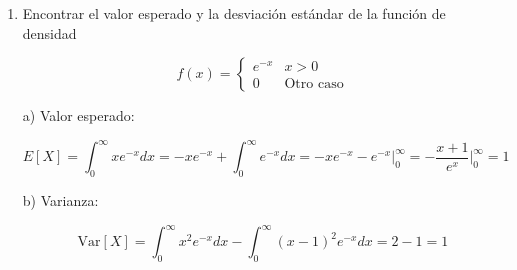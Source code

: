 \documentclass[a4paper, 12pt]{article}
\newcommand{\Aspace}{0.2cm}
\begin{document}
    \begin{enumerate}
        \item Encontrar el valor esperado y la desviación estándar de la función de densidad \par
        \[
            f(x) =
            \begin{cases}
                e^{-x} & x > 0 \\
                0 & \text{Otro caso}
            \end{cases}
        \]
            \vspace{\Aspace}
            { \color{azul} 
                \begin{flushleft}
                    a) Valor esperado:
                \end{flushleft}
                \[
                    E[X] 
                    = \int_{0}^{\infty} xe^{-x}dx
                    = -xe^{-x} + \int_{0}^{\infty} e^{-x}dx
                    = -xe^{-x}-e^{-x} \Big|_{0}^{\infty}
                    = -\frac{x + 1}{e^{x}} \Big|_{0}^{\infty}
                    = 1
                \]

                \begin{flushleft}
                    b) Varianza:
                \end{flushleft}
                \[
                    \text{Var}[X]
                    = \int_{0}^{\infty} x^{2}e^{-x}dx - \int_{0}^{\infty}(x - 1)^{2}e^{-x}dx
                    = 2 - 1
                    = 1
                \]
            }


\end{enumerate}
\end{document}
